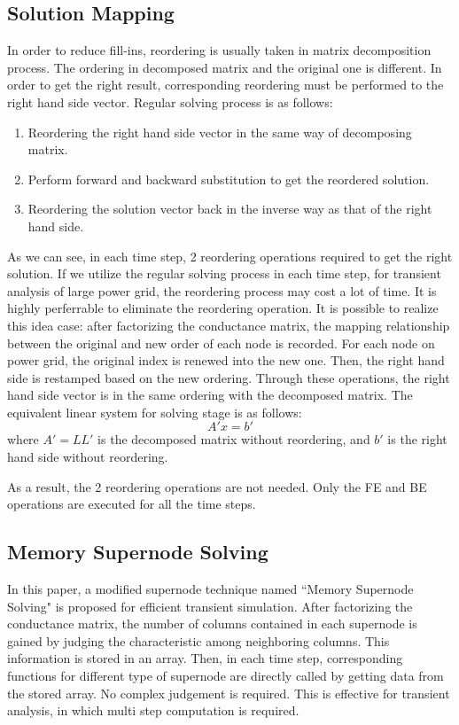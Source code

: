\documentclass[conference]{IEEEtran}
\begin{document}
 \subsection{Solution Mapping}
In order to reduce fill-ins, reordering is usually taken in matrix decomposition process. The ordering in decomposed 
matrix and the original one is different. In order to get the right result, corresponding reordering must be performed to the right hand 
side vector. Regular solving process is as follows:
\begin{enumerate}[1)]
\item Reordering the right hand side vector in the same way of decomposing matrix.
\item Perform forward and backward substitution to get the reordered solution.
\item Reordering the solution vector back in the inverse way as that of the right hand side.
\end{enumerate}
As we can see, in each time step, 2 reordering operations required to get the right solution. If we utilize the regular solving process in each
time step, for transient analysis of large power grid, the reordering process may cost a lot of time. It is highly perferrable to 
eliminate the reordering operation. It is possible to realize this idea case: after factorizing the conductance matrix, the mapping 
relationship between the original and new order of each node is recorded. For each node on power grid, the original index is renewed
into the new one. Then, the right hand side is restamped based on the new ordering. Through these operations, the right hand side vector is
in the same ordering with the decomposed matrix. The equivalent linear system for solving stage is as follows:
\begin{equation}
A'x = b'
\end{equation}
where $A'=LL'$ is the decomposed matrix without reordering, and $b'$ is the right hand side without reordering.

As a result, the 2 reordering operations are not needed. Only the FE and BE operations are executed for all the time steps.
  \subsection{Memory Supernode Solving}
In this paper, a modified supernode technique named ``Memory Supernode Solving" is proposed for efficient transient simulation. After 
factorizing the conductance matrix, the number of columns contained in each supernode is gained by judging the characteristic among 
neighboring columns. This information is stored in an array. Then, in each time step, corresponding functions for different type of 
supernode are directly called by getting data from the stored array. No complex judgement is required. This is effective for transient
analysis, in which multi step computation is required.  
\end{document}
